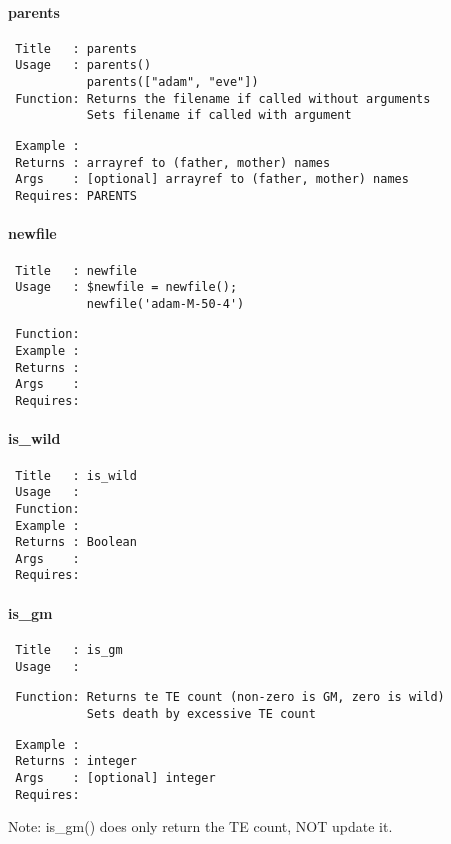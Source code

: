 \paragraph*{parents\label{parents}}
\begin{verbatim}
 Title   : parents
 Usage   : parents()
           parents(["adam", "eve"])
 Function: Returns the filename if called without arguments
           Sets filename if called with argument
\end{verbatim}
\begin{verbatim}
 Example :
 Returns : arrayref to (father, mother) names
 Args    : [optional] arrayref to (father, mother) names
 Requires: PARENTS
\end{verbatim}
\paragraph*{newfile\label{newfile}}
\begin{verbatim}
 Title   : newfile
 Usage   : $newfile = newfile();
           newfile('adam-M-50-4')
\end{verbatim}
\begin{verbatim}
 Function: 
 Example :
 Returns :
 Args    :
 Requires:
\end{verbatim}
\paragraph*{is\_wild\label{is_wild}}
\begin{verbatim}
 Title   : is_wild
 Usage   :
 Function: 
 Example :
 Returns : Boolean
 Args    :
 Requires:
\end{verbatim}
\paragraph*{is\_gm\label{is_gm}}
\begin{verbatim}
 Title   : is_gm
 Usage   :
\end{verbatim}
\begin{verbatim}
 Function: Returns te TE count (non-zero is GM, zero is wild)
           Sets death by excessive TE count
\end{verbatim}
\begin{verbatim}
 Example :
 Returns : integer
 Args    : [optional] integer
 Requires:
\end{verbatim}


Note: is\_gm() does only return the TE count, NOT update it.

